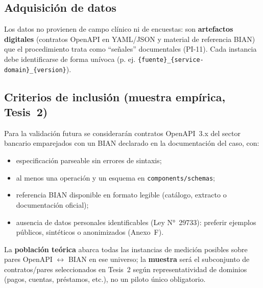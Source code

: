 \subsection{Adquisición de datos}

Los datos no provienen de campo clínico ni de encuestas: son \textbf{artefactos digitales}
(contratos OpenAPI en YAML/JSON y material de referencia BIAN) que el procedimiento trata como
``señales'' documentales (PI-11). Cada instancia debe identificarse de forma unívoca (p. ej.
\texttt{\{fuente\}\_\{service-domain\}\_\{version\}}).



\subsection{Criterios de inclusión (muestra empírica, Tesis~2)}

Para la validación futura se considerarán contratos OpenAPI~3.x del sector bancario emparejados
con un \ServiceDomain{} BIAN declarado en la documentación del caso, con:

\begin{itemize}
  \item especificación parseable sin errores de sintaxis;
  \item al menos una operación y un esquema en \texttt{components/schemas};
  \item referencia BIAN disponible en formato legible (catálogo, extracto o documentación oficial);
  \item ausencia de datos personales identificables (Ley N°~29733): preferir ejemplos públicos,
        sintéticos o anonimizados (Anexo~F).
\end{itemize}

La \textbf{población teórica} abarca todas las instancias de medición posibles sobre pares
OpenAPI $\leftrightarrow$ BIAN en ese universo; la \textbf{muestra} será el subconjunto de
contratos/pares seleccionados en Tesis~2 según representatividad de dominios (pagos, cuentas,
préstamos, etc.), no un piloto único obligatorio.
